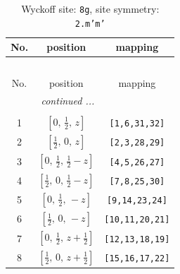\documentclass[fleqn,8pt]{jsarticle}
\begin{document}
\begin{longtable}{ccc}
\caption{Wyckoff site: {\tt 8g}, site symmetry: {\tt 2.m'm'}}
 \\
 \hline \hline
No. & position & mapping \\ \hline \endfirsthead

\multicolumn{2}{l}{\tablename\ \thetable{}} \\
 \hline \hline
No. & position & mapping \\ \hline \endhead

 \hline \hline
\multicolumn{2}{r}{\footnotesize\it continued ...} \\ \endfoot

 \hline \hline
\multicolumn{2}{r}{} \\ \endlastfoot

1 & $\left[ 0,\, \frac{1}{2},\, z \right]$ & {\tt [1,6,31,32]} \\ \hline
2 & $\left[ \frac{1}{2},\, 0,\, z \right]$ & {\tt [2,3,28,29]} \\ \hline
3 & $\left[ 0,\, \frac{1}{2},\, \frac{1}{2} - z \right]$ & {\tt [4,5,26,27]} \\ \hline
4 & $\left[ \frac{1}{2},\, 0,\, \frac{1}{2} - z \right]$ & {\tt [7,8,25,30]} \\ \hline
5 & $\left[ 0,\, \frac{1}{2},\, - z \right]$ & {\tt [9,14,23,24]} \\ \hline
6 & $\left[ \frac{1}{2},\, 0,\, - z \right]$ & {\tt [10,11,20,21]} \\ \hline
7 & $\left[ 0,\, \frac{1}{2},\, z + \frac{1}{2} \right]$ & {\tt [12,13,18,19]} \\ \hline
8 & $\left[ \frac{1}{2},\, 0,\, z + \frac{1}{2} \right]$ & {\tt [15,16,17,22]} \\
\end{longtable}
\renewcommand{\arraystretch}{1.2}
\end{document}
